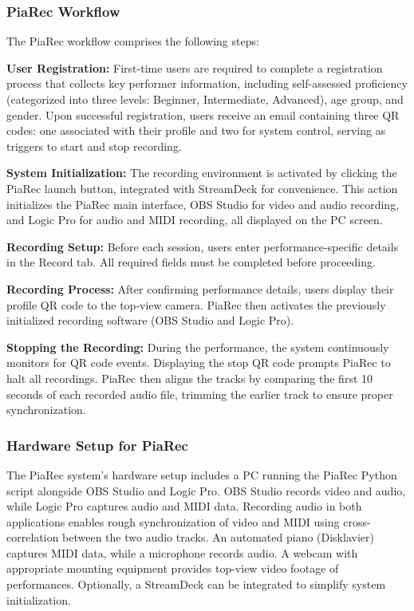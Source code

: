 \documentclass{article}
\begin{document}
\subsubsection{PiaRec Workflow}
The PiaRec workflow comprises the following steps:

\textbf{User Registration:} First-time users are required to complete a registration process that collects key performer information, including self-assessed proficiency (categorized into three levels: Beginner, Intermediate, Advanced), age group, and gender. Upon successful registration, users receive an email containing three QR codes: one associated with their profile and two for system control, serving as triggers to start and stop recording. 

\textbf{System Initialization:} The recording environment is activated by clicking the PiaRec launch button, integrated with StreamDeck for convenience. This action initializes the PiaRec main interface, OBS Studio for video and audio recording, and Logic Pro for audio and MIDI recording, all displayed on the PC screen.

\textbf{Recording Setup:} Before each session, users enter performance-specific details in the Record tab. All required fields must be completed before proceeding.

\textbf{Recording Process:} After confirming performance details, users display their profile QR code to the top-view camera. PiaRec then activates the previously initialized recording software (OBS Studio and Logic Pro).

\textbf{Stopping the Recording:} During the performance, the system continuously monitors for QR code events. Displaying the stop QR code prompts PiaRec to halt all recordings. PiaRec then aligns the tracks by comparing the first 10 seconds of each recorded audio file, trimming the earlier track to ensure proper synchronization.

\subsubsection{Hardware Setup for PiaRec}
The PiaRec system's hardware setup includes a PC running the PiaRec Python script alongside OBS Studio and Logic Pro. OBS Studio records video and audio, while Logic Pro captures audio and MIDI data. Recording audio in both applications enables rough synchronization of video and MIDI using cross-correlation between the two audio tracks. An automated piano (Disklavier) captures MIDI data, while a microphone records audio. A webcam with appropriate mounting equipment provides top-view video footage of performances. Optionally, a StreamDeck can be integrated to simplify system initialization.
\end{document}
